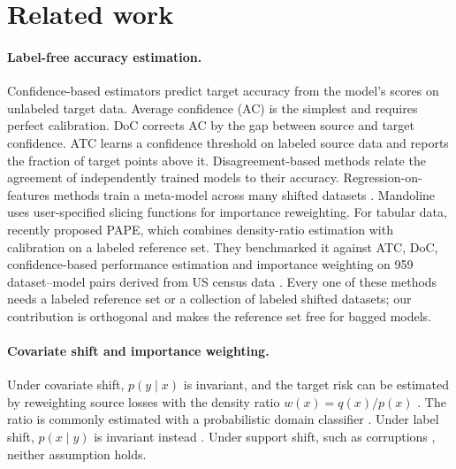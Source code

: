 \section{Related work}
\label{sec:related}

\paragraph{Label-free accuracy estimation.}
Confidence-based estimators predict target accuracy from the model's scores on unlabeled target data. Average confidence (AC) is the simplest and requires perfect calibration. DoC \citep{guillory2021doc} corrects AC by the gap between source and target confidence. ATC \citep{garg2022atc} learns a confidence threshold on labeled source data and reports the fraction of target points above it. Disagreement-based methods \citep{jiang2022gde,baek2022aotl,kirsch2022note} relate the agreement of independently trained models to their accuracy. Regression-on-features methods train a meta-model across many shifted datasets \citep{deng2021labels}. Mandoline \citep{chen2021mandoline} uses user-specified slicing functions for importance reweighting. For tabular data, \citet{bialek2025pape} recently proposed PAPE, which combines density-ratio estimation with calibration on a labeled reference set. They benchmarked it against ATC, DoC, confidence-based performance estimation and importance weighting on 959 dataset--model pairs derived from US census data \citep{ding2021folktables}. Every one of these methods needs a labeled reference set or a collection of labeled shifted datasets; our contribution is orthogonal and makes the reference set free for bagged models.

\paragraph{Covariate shift and importance weighting.}
Under covariate shift, $p(y\mid x)$ is invariant, and the target risk can be estimated by reweighting source losses with the density ratio $w(x)=q(x)/p(x)$ \citep{shimodaira2000,sugiyama2007iwcv}. The ratio is commonly estimated with a probabilistic domain classifier \citep{rabanser2019failing}. Under label shift, $p(x\mid y)$ is invariant instead \citep{lipton2018bbse}. Under support shift, such as corruptions \citep{hendrycks2019corruptions}, neither assumption holds.

